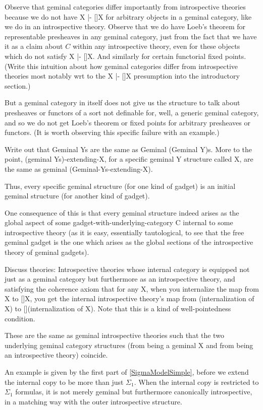 \begin{TODOblock}
Observe that geminal categories differ importantly from introspective theories because we do not have X |- []X for arbitrary objects in a geminal category, like we do in an introspective theory. Observe that we do have Loeb's theorem for representable presheaves in any geminal category, just from the fact that we have it as a claim about $C$ within any introspective theory, even for these objects which do not satisfy X |- []X. And similarly for certain functorial fixed points. (Write this intuition about how geminal categories differ from introspective theories most notably wrt to the X |- []X presumption into the introductory section.)

But a geminal category in itself does not give us the structure to talk about presheaves or functors of a sort not definable for, well, a generic geminal category, and so we do not get Loeb's theorem or fixed points for arbitrary presheaves or functors. (It is worth observing this specific failure with an example.)
\end{TODOblock}

\begin{TODOblock}
Write out that Geminal Ys are the same as Geminal (Geminal Y)s. More to the point, (geminal Ys)-extending-X, for a specific geminal Y structure called X, are the same as geminal (Geminal-Ys-extending-X).

Thus, every specific geminal structure (for one kind of gadget) is an initial geminal structure (for another kind of gadget).

One consequence of this is that every geminal structure indeed arises as the global aspect of some gadget-with-underlying-category C internal to some introspective theory (as it is easy, essentially tautological, to see that the free geminal gadget is the one which arises as the global sections of the introspective theory of geminal gadgets).
\end{TODOblock}

\begin{TODOblock}
Discuss  theories: Introspective theories whose internal category is equipped not just as a geminal category but furthermore as an introspective theory, and satisfying the coherence axiom that for any X, when you internalize the map from X to []X, you get the internal introspective theory's map from (internalization of X) to [](internalization of X). Note that this is a kind of well-pointedness condition.

These are the same as geminal introspective theories such that the two underlying geminal category structures (from being a geminal X and from being an introspective theory) coincide.

An example is given by the first part of \cref{SigmaModelSimple}, before we extend the internal copy to be more than just $\Sigma_1$. When the internal copy is restricted to $\Sigma_1$ formulas, it is not merely geminal but furthermore canonically introspective, in a matching way with the outer introspective structure.
\end{TODOblock}



\fileend